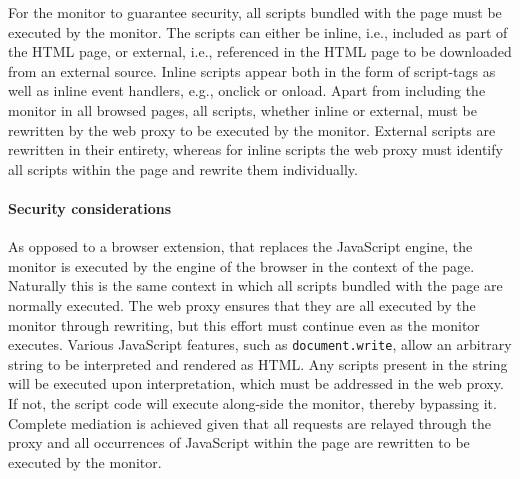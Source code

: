 \documentclass{llncs}
\newcommand{\todo}[1]{\colorbox{red}{\textcolor{white}{\sffamily\bfseries\scriptsize TODO}} \textcolor{red}{#1} \textcolor{red}{$\blacktriangleleft$}}
\begin{document}
For the monitor to guarantee security, all scripts bundled with 
the page must be executed by the monitor. The scripts can either be inline, 
i.e., included as part of the HTML page, or external, i.e., referenced in the 
HTML page to be downloaded from an external source. Inline scripts appear both in the form of script-tags as well as inline event handlers, e.g., onclick or onload.
Apart from including the monitor in all browsed pages, all scripts, whether inline or 
external, must be rewritten by the web proxy to be executed by the monitor.
External scripts are rewritten in their entirety, whereas 
for inline scripts the web proxy must identify all scripts within the page and rewrite them individually.

\vspace{-.4cm}
\paragraph{Security considerations}

As opposed to a browser extension, that replaces the 
JavaScript engine, the monitor is executed by the engine of the browser in the context of the page. Naturally 
this is the same context in which all scripts bundled with the 
page are normally executed. 
The web proxy ensures that they are all executed by
the monitor through rewriting, but this effort must continue even as the monitor executes. 
Various JavaScript features, such as 
\lstinline{document.write}, allow an arbitrary string to be 
interpreted and rendered as HTML. 
Any scripts present in the string will be 
executed upon interpretation, which must be addressed in the web proxy. If not, the script code will execute 
along-side the monitor, thereby bypassing it. 
Complete mediation is achieved given that all requests are relayed through the proxy 
and all occurrences of JavaScript within the page are rewritten to be executed by the monitor.
\end{document}
